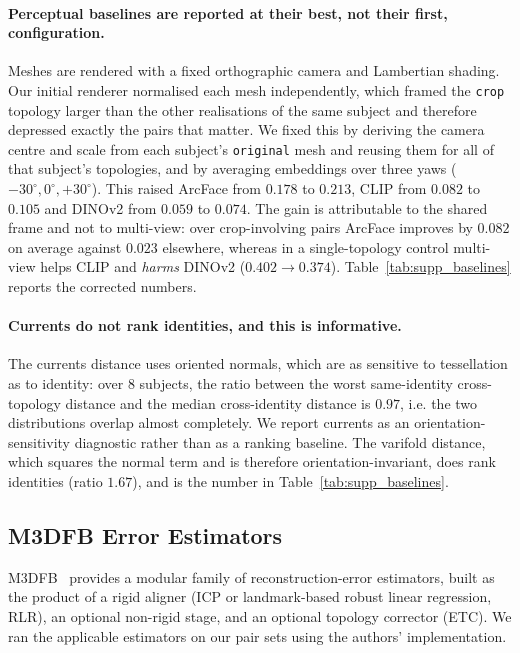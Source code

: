 \documentclass{article}
\begin{document}
\paragraph{Perceptual baselines are reported at their best, not their first, configuration.}
Meshes are rendered with a fixed orthographic camera and Lambertian shading. Our initial
renderer normalised each mesh independently, which framed the \texttt{crop} topology
larger than the other realisations of the same subject and therefore depressed exactly
the pairs that matter. We fixed this by deriving the camera centre and scale from each
subject's \texttt{original} mesh and reusing them for all of that subject's topologies,
and by averaging embeddings over three yaws ($-30^\circ, 0^\circ, +30^\circ$). This
raised ArcFace from $0.178$ to $0.213$, CLIP from $0.082$ to $0.105$ and DINOv2 from
$0.059$ to $0.074$. The gain is attributable to the shared frame and not to multi-view:
over crop-involving pairs ArcFace improves by $0.082$ on average against $0.023$
elsewhere, whereas in a single-topology control multi-view helps CLIP and \emph{harms}
DINOv2 ($0.402 \rightarrow 0.374$). Table~\ref{tab:supp_baselines} reports the corrected
numbers.

\paragraph{Currents do not rank identities, and this is informative.}
The currents distance uses oriented normals, which are as sensitive to tessellation as
to identity: over $8$ subjects, the ratio between the worst same-identity
cross-topology distance and the median cross-identity distance is $0.97$, i.e. the two
distributions overlap almost completely. We report currents as an orientation-sensitivity
diagnostic rather than as a ranking baseline. The varifold distance, which squares the
normal term and is therefore orientation-invariant, does rank identities (ratio $1.67$),
and is the number in Table~\ref{tab:supp_baselines}.

\subsection{M3DFB Error Estimators}
\label{sec:supp_m3dfb}

M3DFB~\cite{fg2025} provides a modular family of reconstruction-error estimators, built
as the product of a rigid aligner (ICP or landmark-based robust linear regression, RLR),
an optional non-rigid stage, and an optional topology corrector (ETC). We ran the
applicable estimators on our pair sets using the authors' implementation.
\end{document}
